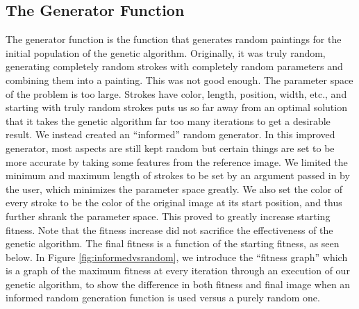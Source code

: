\subsection{The Generator Function}
The generator function is the function that generates random paintings for the initial population of the genetic algorithm. Originally, it was truly random, generating completely random strokes with completely random parameters and combining them into a painting. This was not good enough. The parameter space of the problem is too large. Strokes have color, length, position, width, etc., and starting with truly random strokes puts us so far away from an optimal solution that it takes the genetic algorithm far too many iterations to get a desirable result. We instead created an ``informed'' random generator. In this improved generator, most aspects are still kept random but certain things are set to be more accurate by taking some features from the reference image. We limited the minimum and maximum length of strokes to be set by an argument passed in by the user, which minimizes the parameter space greatly. We also set the color of every stroke to be the color of the original image at its start position, and thus further shrank the parameter space. This proved to greatly increase starting fitness. Note that the fitness increase did not sacrifice the effectiveness of the genetic algorithm. The final fitness is a function of the starting fitness, as seen below. In Figure \ref{fig:informedvsrandom}, we introduce the ``fitness graph'' which is a graph of the maximum fitness at every iteration through an execution of our genetic algorithm, to show the difference in both fitness and final image when an informed random generation function is used versus a purely random one. 



